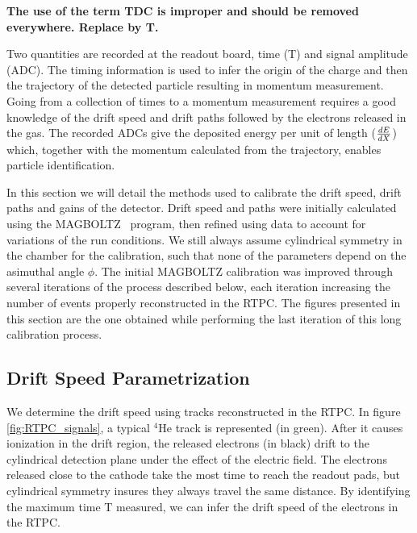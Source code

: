 \documentclass[twocolumn,showpacs,superscriptaddress,groupedaddress]{revtex4}
\begin{document}
{\bf \color{red} The use of the term TDC is improper and should be removed
everywhere. Replace by T.}

Two quantities are recorded at the readout board, 
time (T) and signal amplitude (ADC). The timing information is used to infer 
the origin of the charge and then the trajectory of the detected particle
resulting in momentum measurement. Going from a collection of 
times to a momentum measurement requires a good knowledge of the drift speed 
and drift paths followed by the electrons released in the gas. The recorded ADCs give 
the deposited energy per unit of length ($\small{\frac{dE}{dX}}$) which, 
together with the momentum calculated from the trajectory, enables particle 
identification.

In this section we will detail the methods used to calibrate the drift speed,
drift paths and gains of the detector. Drift speed and paths were initially
calculated using the MAGBOLTZ~\cite{MAGBOLTZ} program, then refined using
data to account for variations of the run conditions. We still always assume 
cylindrical symmetry in the chamber for the calibration, such that none of
the parameters depend on the asimuthal angle $\phi$. The initial MAGBOLTZ
calibration was improved through several iterations of the
process described below, each iteration increasing the number of events 
properly reconstructed in the RTPC. The figures presented in this section
are the one obtained while performing the last iteration of this long 
calibration process.


\subsection{Drift Speed Parametrization}

We determine the drift speed using tracks reconstructed in the RTPC. In figure 
\ref{fig:RTPC_signals}, a typical $^{4}$He track is represented (in green). After 
it causes ionization in the drift region, the released electrons (in black) 
drift to the cylindrical detection plane under the effect of the electric field. The 
electrons released close to the cathode take the most time to reach the readout 
pads, but cylindrical symmetry insures they always travel the same 
distance. By identifying the maximum time T measured, we can infer the drift 
speed of the electrons in the RTPC.\\
\end{document}
